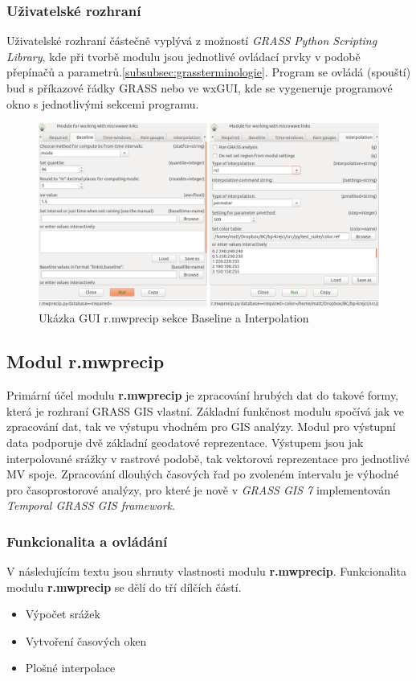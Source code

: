 \documentclass[a4paper,12pt]{report}
\begin{document}
\subsubsection{Uživatelské rozhraní}
Uživatelské rozhraní částečně vyplývá z možností \textit{GRASS Python Scripting Library}, kde při tvorbě modulu jsou jednotlivé ovládací prvky v podobě přepínačů a parametrů.\ref{subsubsec:grassterminologie}. Program se ovládá (spouští) bud s příkazové řádky GRASS nebo ve wxGUI, kde se vygeneruje programové okno s jednotlivými sekcemi programu. 

\begin{figure}[h!]
    \centering
    \includegraphics[width=\textwidth]{./img/grass/gui.png}
    \caption[GUI modul]{Ukázka GUI r.mwprecip sekce Baseline a Interpolation  \centering  }
        \label{fig:baseline}
 \end{figure}

\subsection{Modul r.mwprecip}
Primární účel  modulu \textbf{r.mwprecip} je zpracování hrubých dat do takové formy, která je rozhraní GRASS GIS vlastní. Základní funkčnost modulu spočívá jak ve zpracování dat, tak ve výstupu vhodném pro GIS analýzy. Modul pro výstupní data podporuje dvě základní geodatové reprezentace. Výstupem jsou jak interpolované srážky v rastrové podobě, tak vektorová reprezentace pro jednotlivé MV spoje. 
Zpracování dlouhých časových řad po zvoleném intervalu je výhodné pro časoprostorové analýzy, pro které je nově v \textit{GRASS GIS 7} implementován \textit{Temporal GRASS GIS framework}.





 
\subsubsection{Funkcionalita a ovládání}
V následujícím textu jsou shrnuty vlastnosti modulu \textbf{r.mwprecip}. Funkcionalita modulu \textbf{r.mwprecip} se dělí do tří dílčích částí.
\begin{itemize}
\item Výpočet srážek
\item Vytvoření časových oken
\item Plošné interpolace 
\end{itemize}
\end{document}
